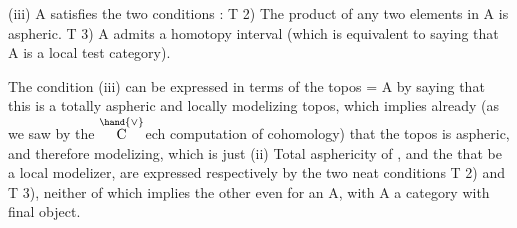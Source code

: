 
(iii)  A satisfies the two conditions :
T 2) The product  of any two elements in A is aspheric.
T 3) A\hand{\ensuremath{^{\wedge}}} admits a homotopy interval (which is equivalent to
saying that A is a local test category).

 The condition (iii) can be expressed in terms of the topos  = A\hand{\ensuremath{^{\wedge}}}
by saying that this is a totally aspheric and locally modelizing topos,
which implies already (as we saw by the \ensuremath{\overset{\hand{\vee}}{\mathrm{C}}}ech computation of cohomology)
that the topos is aspheric, and therefore modelizing, which is just (ii)
 Total asphericity of  , and the  that  be a local modelizer, are
expressed respectively by the two neat conditions T 2) and T 3), neither
of which implies the other even for an A\hand{\ensuremath{^{\wedge}}}, with A a category with final
object. 

